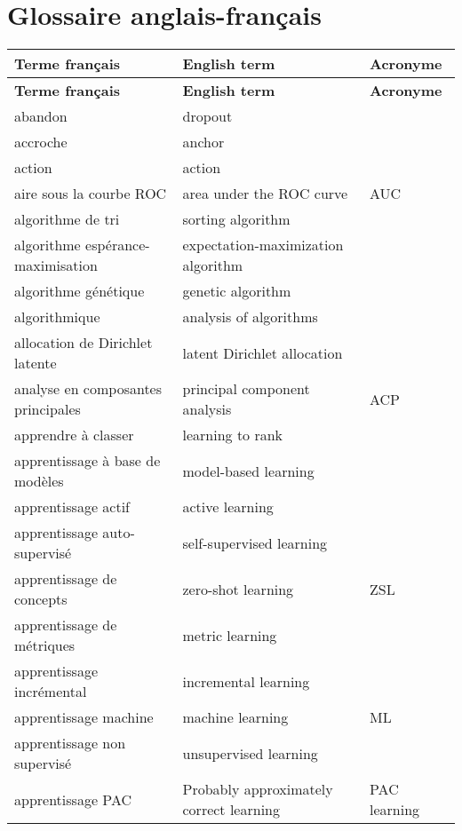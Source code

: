 \hypertarget{preface}{%
\chapter*{Glossaire anglais-français}\label{glossary}}


\begin{longtable}{p{} p{} p{}} 
\textbf{Terme français} & \textbf{English term}  & \textbf{Acronyme} \\ \endfirsthead
\textbf{Terme français} & \textbf{English term}  & \textbf{Acronyme} \\ \endhead
abandon & dropout &  \\ 
accroche & anchor &  \\ 
action & action &  \\ 
aire sous la courbe ROC & area under the ROC curve & AUC \\ 
algorithme de tri & sorting algorithm &  \\ 
algorithme espérance-maximisation & expectation-maximization algorithm &  \\ 
algorithme génétique & genetic algorithm &  \\ 
algorithmique & analysis of algorithms &  \\ 
allocation de Dirichlet latente & latent Dirichlet allocation &  \\ 
analyse en composantes principales & principal component analysis & ACP \\ 
apprendre à classer & learning to rank &  \\ 
apprentissage à base de modèles & model-based learning &  \\ 
apprentissage actif & active learning &  \\ 
apprentissage auto-supervisé & self-supervised learning &  \\ 
apprentissage de concepts & zero-shot learning & ZSL \\ 
apprentissage de métriques & metric learning &  \\ 
apprentissage incrémental & incremental learning &  \\ 
apprentissage machine & machine learning & ML \\ 
apprentissage non supervisé & unsupervised learning &  \\ 
apprentissage PAC & Probably approximately correct learning & PAC learning \\ 

\end{longtable}
